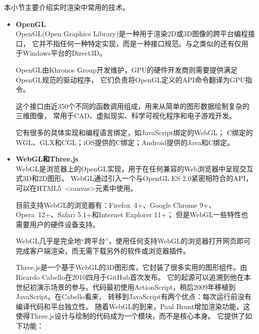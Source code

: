 本小节主要介绍实时渲染中常用的技术。

\begin{itemize}

    \item \textbf{OpenGL} \\


    OpenGL(Open Graphics Library)是一种用于渲染2D或3D图像的跨平台编程接口\cite{opengl}，
    它并不指任何一种特定实现，而是一种接口规范。与之类似的还有仅用于Windows平台的Direct3D。

    OpenGL由Khronos Group开发维护，GPU的硬件开发商则需要提供满足OpenGL规范的驱动程序，
    它们负责将OpenGL定义的API命令翻译为GPU指令。

    这个接口由近350个不同的函数调用组成，用来从简单的图形数据绘制复杂的三维图像，
    常用于CAD、虚拟现实、科学可视化程序和电子游戏开发。 

    它有很多的具体实现和编程语言绑定，如JavaScript绑定的WebGL；
    C绑定的WGL、GLX和CGL；iOS提供的C绑定；Android提供的Java和C绑定。


    \item \textbf{WebGL和Three.js} \\


    WebGL是浏览器上的OpenGL实现，用于在任何兼容的Web浏览器中呈现交互式3D和2D图形\cite{webgl}。
    WebGL通过引入一个与OpenGL ES 2.0紧密相符合的API，可以在HTML5 <canvas>元素中使用。

    目前支持WebGL的浏览器有：Firefox 4+、Google Chrome 9+、Opera 12+、Safari 5.1+和Internet Explorer 11+；
    但是WebGL一些特性也需要用户的硬件设备支持。

    WebGL几乎是完全地“跨平台”，使用任何支持WebGL的浏览器打开网页即可完成客户端渲染，而无需下载另外的软件或浏览器插件。

    Three.js是一个基于WebGL的3D图形库\cite{threejs}，它封装了很多实用的图形组件。由Ricardo Cabello在2010四月于GitHub首次发布。
    它的起源可以追溯到他在本世纪初演示场景的参与。代码最初使用ActionScript，稍后2009年移植到JavaScript。在Cabello看来，
    转移到JavaScript有两个优点：每次运行前没有编译代码和平台独立性。
    随着WebGL的到来，Paul Brunt增加渲染功能，这使得Three.js设计与绘制的代码成为一个模块，而不是核心本身。
    它提供了如下功能：


\end{itemize}
